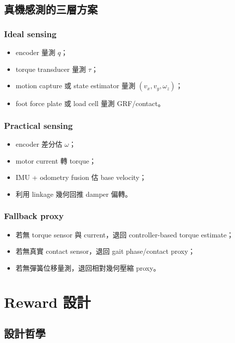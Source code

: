 \documentclass[12pt,a4paper,UTF8]{ctexart}
\begin{document}
\subsection{真機感測的三層方案}

\subsubsection*{Ideal sensing}
\begin{itemize}[leftmargin=2em]
    \item encoder 量測 $q$；
    \item torque transducer 量測 $\tau$；
    \item motion capture 或 state estimator 量測 $(v_x,v_y,\omega_z)$；
    \item foot force plate 或 load cell 量測 GRF/contact。
\end{itemize}

\subsubsection*{Practical sensing}
\begin{itemize}[leftmargin=2em]
    \item encoder 差分估 $\omega$；
    \item motor current 轉 torque；
    \item IMU + odometry fusion 估 base velocity；
    \item 利用 linkage 幾何回推 damper 偏轉。
\end{itemize}

\subsubsection*{Fallback proxy}
\begin{itemize}[leftmargin=2em]
    \item 若無 torque sensor 與 current，退回 controller-based torque estimate；
    \item 若無真實 contact sensor，退回 gait phase/contact proxy；
    \item 若無彈簧位移量測，退回相對幾何壓縮 proxy。
\end{itemize}

\section{Reward 設計}

\subsection{設計哲學}
\end{document}
